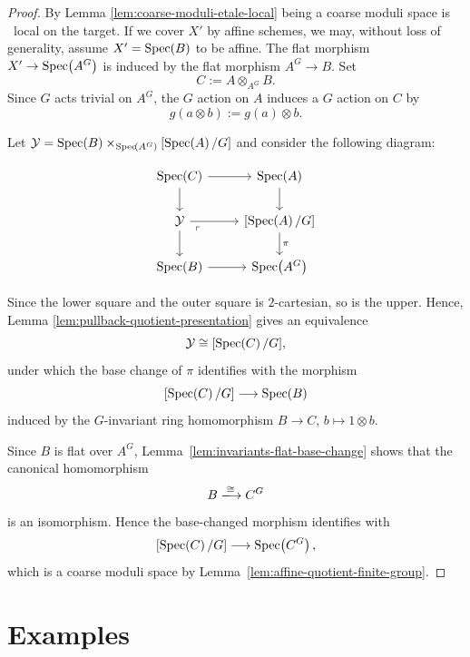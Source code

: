 \begin{proof}
	By Lemma \ref{lem:coarse-moduli-etale-local} being a coarse moduli space is \etale\ local on the target. If we cover $X'$ by affine schemes, we may, without loss of generality, assume $X' = \operatorname{Spec}\!\left(B\right)$ to be affine. The flat morphism $X' \to \operatorname{Spec}\!\left(A^G\right)$ is induced by the flat morphism $A^G \to B$. 
	Set
	\[
	C := A\otimes_{A^G}B.
	\]
	Since $G$ acts trivial on $A^G$, the $G$ action on $A$ induces a $G$ action on $C$ by 
	\[
	g(a\otimes b) := g(a) \otimes b.
	\]
	
	Let $\mathcal{Y} = \operatorname{Spec}\!\left(B\right) \times_{\operatorname{Spec}\!\left(A^G\right)}[\operatorname{Spec}\!\left(A\right) / G]$ and consider the following diagram:
	
	\[\begin{tikzcd}
		{\Specof{C}} & {\Specof{A}} \\
		{\mathcal{Y}} & {[\Specof{A}/G]} \\
		{\Specof{B}} & {\Specof{A^G}}
		\arrow[from=1-1, to=1-2]
		\arrow[from=1-1, to=2-1]
		\arrow[from=1-2, to=2-2]
		\arrow[from=2-1, to=2-2]
		\arrow[from=2-1, to=3-1]
		\arrow["\ulcorner"{anchor=center, pos=0.125}, draw=none, from=2-1, to=3-2]
		\arrow["\pi", from=2-2, to=3-2]
		\arrow[from=3-1, to=3-2]
	\end{tikzcd}\]
	
	Since the lower square and the outer square is $2$-cartesian, so is the upper.
	Hence, Lemma \ref{lem:pullback-quotient-presentation} gives
	an equivalence
	\[
	\mathcal{Y} \cong [\operatorname{Spec}\!\left(C\right)/G],
	\]
	under which the base change of $\pi$ identifies with the
	morphism
	\[
	[\operatorname{Spec}\!\left(C\right)/G]\longrightarrow\operatorname{Spec}\!\left(B\right)
	\]
	induced by the $G$-invariant ring homomorphism
	$B\to C$, $b\mapsto 1\otimes b$.
	
	Since $B$ is flat over $A^G$,
	Lemma~\ref{lem:invariants-flat-base-change} shows that the
	canonical homomorphism
	\[
	B \xlongrightarrow{\cong} C^G
	\]
	is an isomorphism. Hence the base-changed morphism identifies
	with
	\[
	[\operatorname{Spec}\!\left(C\right)/G]\longrightarrow\operatorname{Spec}\!\left(C^G\right),
	\]
	which is a coarse moduli space by
	Lemma~\ref{lem:affine-quotient-finite-group}.
\end{proof}


\section{Examples}

